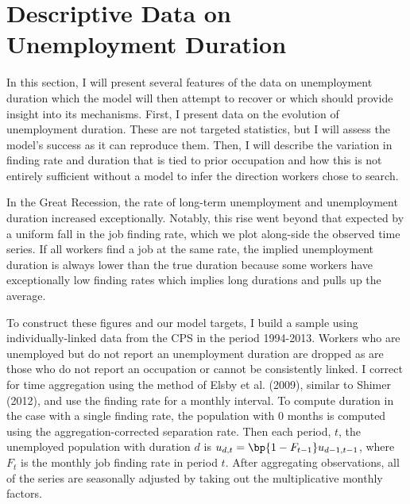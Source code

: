 \documentclass[12pt]{article}
\theoremstyle{definition}
\begin{document}
\section{Descriptive Data on Unemployment Duration}

In this section, I will present several features of the data on unemployment duration which the model will then attempt to recover or which should provide insight into its mechanisms. First, I present data on the evolution of unemployment duration. These are not targeted  statistics, but I will assess the model's success as it can reproduce them. Then, I will describe the variation in finding rate and duration that is tied to prior occupation and how this is not entirely sufficient without a model to infer the direction workers chose to search.

In the Great Recession, the rate of long-term unemployment and unemployment duration increased exceptionally. Notably, this rise went beyond that expected by a uniform fall in the job finding rate, which we plot along-side the observed time series. If all workers find a job at the same rate, the implied unemployment duration is always lower than the true duration because some workers have exceptionally low finding rates which implies long durations and pulls up the average.

To construct these figures and our model targets, I build a sample using individually-linked data from the CPS in the period 1994-2013. Workers who are unemployed but do not report an unemployment duration are dropped as are those who do not report an occupation or cannot be consistently linked. I correct for time aggregation using the method of Elsby et al. (2009), similar to Shimer (2012), and use the finding rate for a monthly interval. To compute duration in the case with a single finding rate, the population with 0 months is computed using the aggregation-corrected separation rate. Then each period, $t$, the unemployed population with duration $d$ is $u_{d,t} = \bp{1- F_{t-1}} u_{d-1, t-1}$, where $F_t$ is the monthly job finding rate in period $t$. After aggregating observations, all of the series are seasonally adjusted by taking out the multiplicative monthly factors.
\end{document}
